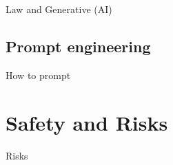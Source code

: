 \documentclass[10pt]{beamer}
\begin{document}
\begin{frame}{Law and Generative (AI)}


\end{frame}



\subsection{Prompt engineering}

\begin{frame}{How to prompt}


\end{frame}

\section{Safety and Risks}

\begin{frame}{Risks}


\end{frame}
\end{document}
